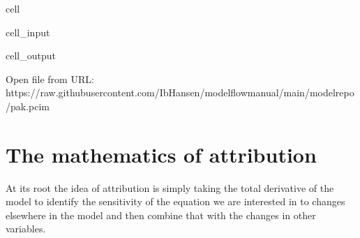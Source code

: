 \documentclass[letterpaper,10pt,english]{jupyterBook}
\begin{document}
\begin{sphinxuseclass}{cell}\begin{sphinxVerbatimInput}

\begin{sphinxuseclass}{cell_input}
\begin{sphinxVerbatim}[commandchars=\\\{\}]
  
    
   
\end{sphinxVerbatim}

\end{sphinxuseclass}\end{sphinxVerbatimInput}
\begin{sphinxVerbatimOutput}

\begin{sphinxuseclass}{cell_output}
\begin{sphinxVerbatim}[commandchars=\\\{\}]
Open file from URL:  https://raw.githubusercontent.com/IbHansen/modelflow\PYGZhy{}manual/main/model\PYGZus{}repo/pak.pcim
\end{sphinxVerbatim}

\end{sphinxuseclass}\end{sphinxVerbatimOutput}

\end{sphinxuseclass}

\section{The mathematics of attribution}
\label{\detokenize{content/06_ModelAnalytics/Attribution:the-mathematics-of-attribution}}
\sphinxAtStartPar
At its root the idea of attribution is simply taking the total derivative of the model to identify the sensitivity of the equation we are interested in to changes elsewhere in the model and then combine that with the changes in other variables.
\end{document}
